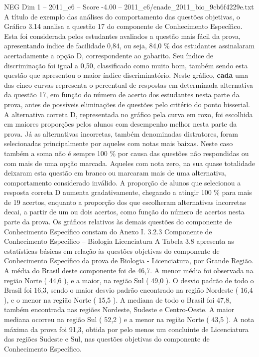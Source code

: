 \begin{textsample}{NEG Dim 1 – 2011\_c6 – Score -4.00 – 2011\_c6/enade\_2011\_bio\_9cb6f4229e.txt}
A título de exemplo das análises do comportamento das questões objetivas, o Gráfico 3.14 analisa a questão 17 do componente de Conhecimento Específico.
Esta foi considerada pelos estudantes avaliados a questão mais fácil da prova, apresentando índice de facilidade 0,84, ou seja, 84,0 \% dos estudantes assinalaram acertadamente a opção D, correspondente ao gabarito.
Seu índice de discriminação foi igual a 0,50, classificado como muito bom, também sendo esta questão que apresentou o maior índice discriminatório.
Neste gráfico, \textbf{cada} uma das cinco curvas representa o percentual de respostas em determinada alternativa da questão 17, em função do número de acerto dos estudantes nesta parte da prova, antes de possíveis eliminações de questões pelo critério do ponto bisserial.
A alternativa correta D, representada no gráfico pela curva em roxo, foi escolhida em maiores proporções pelos alunos com desempenho melhor nesta parte da prova.
Já as alternativas incorretas, também denominadas distratores, foram selecionadas principalmente por aqueles com notas mais baixas.
Neste caso também a soma não é sempre 100 \% por causa das questões não respondidas ou com mais de uma opção marcada.
Aqueles com nota zero, na sua quase totalidade deixaram esta questão em branco ou marcaram mais de uma alternativa, comportamento considerado inválido.
A proporção de alunos que selecionou a resposta correta D aumenta gradativamente, chegando a atingir 100 \% para mais de 19 acertos, enquanto a proporção dos que escolheram alternativas incorretas decai, a partir de um ou dois acertos, como função do número de acertos nesta parte da prova.
Os gráficos relativos às demais questões do componente de Conhecimento Específico constam do Anexo I. 3.2.3 Componente de Conhecimento Específico – Biologia Licenciatura A Tabela 3.8 apresenta as estatísticas básicas em relação às questões objetivas do componente de Conhecimento Específico da prova de Biologia - Licenciatura, por Grande Região.
A média do Brasil deste componente foi de 46,7.
A menor média foi observada na região Norte ( 44,6 ), e a maior, na região Sul ( 49,0 ).
O desvio padrão de todo o Brasil foi 16,3, sendo o maior desvio padrão encontrado na região Nordeste ( 16,4 ), e o menor na região Norte ( 15,5 ).
A mediana de todo o Brasil foi 47,8, também encontrada nas regiões Nordeste, Sudeste e Centro-Oeste.
A maior mediana ocorreu na região Sul ( 52,2 ) e a menor na região Norte ( 43,5 ).
A nota máxima da prova foi 91,3, obtida por pelo menos um concluinte de Licenciatura das regiões Sudeste e Sul, nas questões objetivas do componente de Conhecimento Específico.

\end{textsample}
